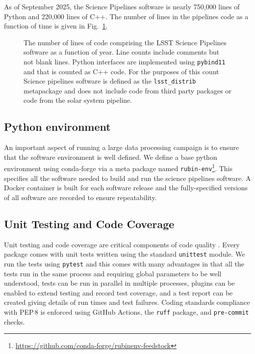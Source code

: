 As of September 2025, the Science Pipelines software is nearly 750,000 lines of Python and 220,000 lines of C++.
The number of lines in the pipelines code as a function of time is given in Fig.~\ref{fig:pipe-loc}.

\begin{figure}
\caption{The number of lines of code comprising the LSST Science Pipelines software as a function of year.
Line counts include comments but not blank lines. Python interfaces are implemented using \texttt{pybind11} and that is counted as C++ code. For the purposes of this count Science pipelines software is defined as the \texttt{lsst\_distrib} metapackage and does not include code from third party packages or code from the solar system pipeline.}
\label{fig:pipe-loc}
\end{figure}

\subsection{Python environment}

An important aspect of running a large data processing campaign is to ensure that the software environment is well defined.
We define a base python environment using conda-forge via a meta package named \texttt{rubin-env}\footnote{\url{https://github.com/conda-forge/rubinenv-feedstock}}.
This specifies all the software needed to build and run the science pipelines software.
A Docker container is built for each software release and the fully-specified versions of all software are recorded to ensure repeatability.

\subsection{Unit Testing and Code Coverage}

Unit testing and code coverage are critical components of code quality \citep{2018SPIE10707E..09J}.
Every package comes with unit tests written using the standard \texttt{unittest} module.
We run the tests using \texttt{pytest} \citep{pytest} and this comes with many advantages in that all the tests run in the same process and requiring global parameters to be well understood, tests can be run in parallel in multiple processes, plugins can be enabled to extend testing and record test coverage, and a test report can be created giving details of run times and test failures.
Coding standards compliance with PEP\,8 \citep{pep8} is enforced using GitHub Actions, the \texttt{ruff} package, and \texttt{pre-commit} checks.

